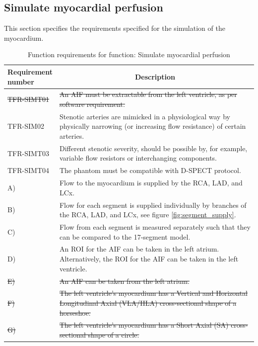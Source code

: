 \subsection{Simulate myocardial perfusion}
This section specifies the requirements specified for the simulation of the myocardium.
\begin{table} [H]
\caption{Function requirements for function: Simulate myocardial perfusion}
\label{tab:funcsim}
\begin{tabular}{l|p{120mm}|}
	\makecell[l]{\textbf{Requirement} \\  \textbf{number}} & \multicolumn{1}{c}{\textbf{Description}}\\
	\hline
	\sout{TFR-SIMT01} & \sout{An \ac{AIF} must be extractable from the left ventricle, as per software requirement.}\\
	TFR-SIM02 & Stenotic arteries are mimicked in a physiological way by physically narrowing (or increasing flow resistance) of certain arteries. \\
	TFR-SIMT03 & Different stenotic severity, should be possible by, for example, variable flow resistors or interchanging components. \\
	TFR-SIMT04 & The phantom must be compatible with D-SPECT protocol. \\
	\hspace{1.5cm} A) & Flow to the myocardium is supplied by the RCA, LAD, and LCx. \\
	\hspace{1.5cm} B) & Flow for each segment is supplied individually by branches of the RCA, LAD, and LCx, see figure \ref{fig:segment_supply}. \\
	\hspace{1.5cm} C) & Flow from each segment is measured separately such that they can be compared to the 17-segment model. \\
	\hspace{1.5cm} D) & An ROI for the AIF can be taken in the left atrium. Alternatively, the ROI for the AIF can be taken in the left ventricle. \\
	\hspace{1.5cm} \sout{E)} & \sout{An AIF can be taken from the left atrium.} \\
	\hspace{1.5cm} \sout{F)} & \sout{The left ventricle's myocardium has a Vertical and Horizontal Longitudinal Axial (VLA/HLA) cross-sectional shape of a horseshoe.} \\
	\hspace{1.5cm} \sout{G)} & \sout{The left ventricle's myocardium has a Short Axial (SA) cross-sectional shape of a circle.} \\

\end{tabular}
\end{table}
